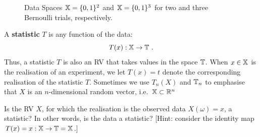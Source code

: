 \begin{figure}
\caption{Data Spaces $\mathbb{X}=\{0,1\}^2$ and $\mathbb{X}=\{0,1\}^3$ for two and three Bernoulli trials, respectively.\label{F:BernoulliDataSpace2and3}}
\centering   {}
\end{figure}

\begin{definition}[Statistic]\label{D:Statistic}
A {\bf statistic} $T$ is any
function of the data:
\[
T(x) : \mathbb{X} \to \mathbb{T} \ .
\]
Thus, a statistic $T$ is also an RV that takes values in the space $\mathbb{T}$.  When $x \in \mathbb{X}$ is the realisation of an experiment, we let $T(x)=t$ denote the corresponding realisation of the statistic $T$. Sometimes we use $T_n(X)$ and $\mathbb{T}_n$ to emphasise that $X$ is an $n$-dimensional random vector, i.e.~$\mathbb{X} \subset \mathbb{R}^n$
\end{definition}

\begin{classwork}
Is the RV $X$, for which the realisation is the observed data $X(\omega)=x$, a statistic?  In other words, is the data a statistic? [Hint: consider the identity map $T(x)=x: \mathbb{X} \to \mathbb{T}=\mathbb{X}$.]
\end{classwork}

